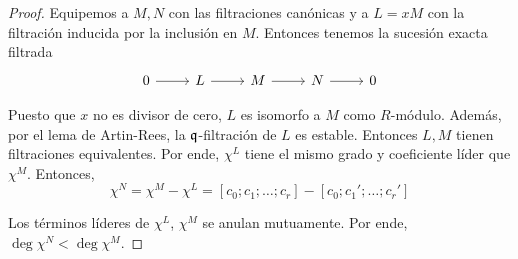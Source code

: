 \begin{proof}
Equipemos a $M, N$ con las filtraciones canónicas y a $L = xM$ con la filtración inducida por la inclusión en $M$. Entonces tenemos la sucesión exacta filtrada
$$
\begin{tikzcd}
    0 \arrow[r] & L \arrow[r] & M \arrow[r] & N \arrow[r] & 0
\end{tikzcd}
$$

Puesto que $x$ no es divisor de cero, $L$ es isomorfo a $M$ como $R$-módulo. Además, por el lema de Artin-Rees, la $\mathfrak q$-filtración de $L$ es estable. Entonces $L, M$ tienen filtraciones equivalentes. Por ende, $\chi^L$ tiene el mismo grado y coeficiente líder que $\chi^M$. Entonces,
$$\chi^N = \chi^M - \chi^L = [c_0; c_1; \dots; c_r] - [c_0; c_1'; \dots; c_r']$$

Los términos líderes de $\chi^L$, $\chi^M$ se anulan mutuamente. Por ende, $\deg \chi^N < \deg \chi^M$.
\end{proof}
